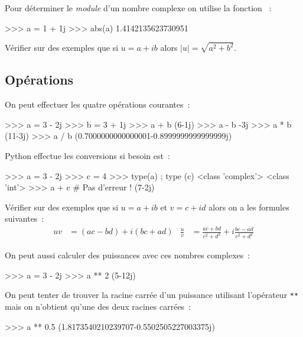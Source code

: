 Pour déterminer le \textit{module} d'un nombre complexe on utilise la fonction
~:

\begin{pythoncode}
>>> a = 1 + 1j
>>> abs(a)
1.4142135623730951
\end{pythoncode}

\begin{exercice}
Vérifier sur des exemples que si $u=a +ib$ alors $|u|=\sqrt{a^2+b^2}$.
\end{exercice}


\subsection{Opérations}
On peut effectuer les quatre opérations courantes~:

\begin{pythoncode}
>>> a = 3 - 2j
>>> b = 3 + 1j
>>> a + b
(6-1j)
>>> a - b
-3j
>>> a * b
(11-3j)
>>> a / b
(0.7000000000000001-0.8999999999999999j)
\end{pythoncode}

\begin{remarque}
Python effectue les conversions si besoin est~:
\begin{pythoncode}
>>> a = 3 - 2j
>>> c = 4
>>> type(a) ; type (c)
<class 'complex'>
<class 'int'>
>>> a + c                # Pas d'erreur !
(7-2j)
\end{pythoncode}
\end{remarque}

\begin{exercice}
Vérifier sur des exemples que si $u=a+ib$ et $v=c + id$ alors on a les formules suivantes~:
\begin{align*}
uv &= (ac - bd) + i(bc+ad)
&
\frac{u}{v} &= \frac{ac +bd}{c^2 + d^2} + i\frac{bc-ad}{c^2+d^2}
\end{align*}
\end{exercice}

On peut aussi calculer des puissances avec ces nombres complexes~:
\begin{pythoncode}
>>> a = 3 - 2j
>>> a ** 2
(5-12j)
\end{pythoncode}
On peut tenter de trouver la racine carrée d'un puissance utilisant l'opérateur \texttt{**} mais
on n'obtient qu'une des deux racines carrées~:
\begin{pythoncode}
>>> a ** 0.5
(1.8173540210239707-0.5502505227003375j)
\end{pythoncode}


